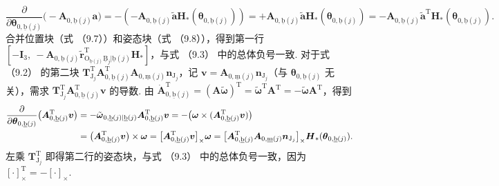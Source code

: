 \[
\frac{\partial}{\partial \boldsymbol{\theta}_{0,\underline{\text{b}}(j)}}\big(-\boldsymbol{A}_{0,\underline{\text{b}}(j)}\boldsymbol{a}\big) = -(-\boldsymbol{A}_{0,\underline{\text{b}}(j)}\tilde{\boldsymbol{a}}\boldsymbol{H}_*(\boldsymbol{\theta}_{0,\underline{\text{b}}(j)})) = +\boldsymbol{A}_{0,\underline{\text{b}}(j)}\tilde{\boldsymbol{a}}\boldsymbol{H}_*(\boldsymbol{\theta}_{0,\underline{\text{b}}(j)}) = -\boldsymbol{A}_{0,\underline{\text{b}}(j)}\tilde{\boldsymbol{a}}^\text{T}\boldsymbol{H}_*(\boldsymbol{\theta}_{0,\underline{\text{b}}(j)}).
\]
合并位置块（式 （9.7））和姿态块（式 （9.8）），得到第一行 $[-\boldsymbol{I}_3,\ -\boldsymbol{A}_{0,\underline{\text{b}}(j)}\tilde{\boldsymbol{r}}_{\text{O}_{\underline{\text{b}}(j)}\underline{\text{B}}_j|\underline{\text{b}}(j)}^\text{T}\boldsymbol{H}_*]$，与式 （9.3） 中的总体负号一致.
对于式 （9.2） 的第二块 $\boldsymbol{T}_{\text{J}_j}^\text{T}\boldsymbol{A}_{0,\underline{\text{b}}(j)}^\text{T}\boldsymbol{A}_{0,\underline{\text{m}}(j)}\boldsymbol{n}_{\text{J}_j}$，记 $\boldsymbol{v} = \boldsymbol{A}_{0,\underline{\text{m}}(j)}\boldsymbol{n}_{\text{J}_j}$（与 $\boldsymbol{\theta}_{0,\underline{\text{b}}(j)}$ 无关），需求 $\boldsymbol{T}_{\text{J}_j}^\text{T}\boldsymbol{A}_{0,\underline{\text{b}}(j)}^\text{T}\boldsymbol{v}$ 的导数. 由 $\dot{\boldsymbol{A}}_{0,\underline{\text{b}}(j)}^\text{T} = (\boldsymbol{A}\tilde{\boldsymbol{\omega}})^\text{T} = \tilde{\boldsymbol{\omega}}^\text{T}\boldsymbol{A}^\text{T} = -\tilde{\boldsymbol{\omega}}\boldsymbol{A}^\text{T}$，得到
\begin{align*}\frac{\partial}{\partial \boldsymbol{\theta}_{0,\underline{\text{b}}(j)}}\big(\boldsymbol{A}_{0,\underline{\text{b}}(j)}^\text{T}\boldsymbol{v}\big)
    &= -\tilde{\boldsymbol{\omega}}_{0,\underline{\text{b}}(j)|\underline{\text{b}}(j)}\boldsymbol{A}_{0,\underline{\text{b}}(j)}^\text{T}\boldsymbol{v}
    = -\big(\boldsymbol{\omega}\times(\boldsymbol{A}_{0,\underline{\text{b}}(j)}^\text{T}\boldsymbol{v})\big) \notag \\
    &= \big(\boldsymbol{A}_{0,\underline{\text{b}}(j)}^\text{T}\boldsymbol{v}\big)\times\boldsymbol{\omega}
    = \big[\boldsymbol{A}_{0,\underline{\text{b}}(j)}^\text{T}\boldsymbol{v}\big]_\times\boldsymbol{\omega}
    = \big[\boldsymbol{A}_{0,\underline{\text{b}}(j)}^\text{T}\boldsymbol{A}_{0,\underline{\text{m}}(j)}\boldsymbol{n}_{\text{J}_j}\big]_\times\boldsymbol{H}_*(\boldsymbol{\theta}_{0,\underline{\text{b}}(j)}).\end{align*}
左乘 $\boldsymbol{T}_{\text{J}_j}^\text{T}$ 即得第二行的姿态块，与式 （9.3） 中的总体负号一致，因为 $[\cdot]_\times^\text{T} = -[\cdot]_\times$.

